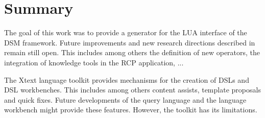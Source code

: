\section{Summary}
The goal of this work was to provide a generator for the LUA interface of the
DSM framework. Future improvements and new research directions described in  
\cite{297:Frey2010} remain still open. This includes among others the definition
of new operators, the integration of knowledge tools in the RCP application, ...

The Xtext language toolkit provides mechanisms for the creation of DSLs
and DSL workbenches. This includes among others content assists, template 
proposals and quick fixes. Future developments of the query language and the 
language workbench might provide these features. However, the 
toolkit has its limitations.
